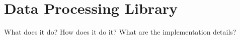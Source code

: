 \documentclass[../00_main.tex]{subfiles}
\begin{document}
\section{Data Processing Library}

What does it do? How does it do it? What are the implementation details?
\end{document}
